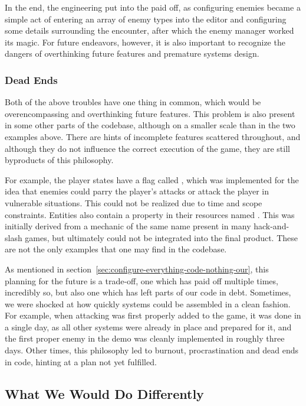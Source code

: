 \documentclass[../Main.tex]{subfiles}
\begin{document}
In the end, the engineering put into the  paid off, as configuring enemies became a simple act of entering an array of enemy types into the editor and configuring some details surrounding the encounter, after which the enemy manager worked its magic. For future endeavors, however, it is also important to recognize the dangers of overthinking future features and premature systems design.

\subsubsection{Dead Ends}\label{sec:dead-ends}

Both of the above troubles have one thing in common, which would be overencompassing and overthinking future features. This problem is also present in some other parts of the codebase, although on a smaller scale than in the two examples above. There are hints of incomplete features scattered throughout, and although they do not influence the correct execution of the game, they are still byproducts of this philosophy.

For example, the player states have a flag called , which was implemented for the idea that enemies could parry the player's attacks or attack the player in vulnerable situations. This could not be realized due to time and scope constraints. Entities also contain a property in their resources named . This was initially derived from a mechanic of the same name present in many hack-and-slash games, but ultimately could not be integrated into the final product. These are not the only examples that one may find in the codebase.

As mentioned in section~\ref{sec:configure-everything-code-nothing-our}, this planning for the future is a trade-off, one which has paid off multiple times, incredibly so, but also one which has left parts of our code in debt. Sometimes, we were shocked at how quickly systems could be assembled in a clean fashion. For example, when attacking was first properly added to the game, it was done in a single day, as all other systems were already in place and prepared for it, and the first proper enemy in the demo was cleanly implemented in roughly three days. Other times, this philosophy led to burnout, procrastination and dead ends in code, hinting at a plan not yet fulfilled.

\subsection{What We Would Do Differently}\label{sec:what-we-would-do-differently}
\end{document}
